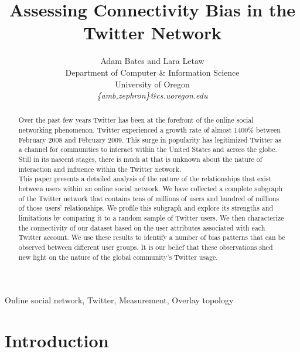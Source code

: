 \documentclass[10pt,twocolumn]{IEEEtran11}
\begin{document}


\title{\Large \bf Assessing Connectivity Bias in the Twitter Network
}

\author{Adam Bates and Lara Letaw\\
Department of Computer \& Information Science\\
University of Oregon\\
\textit{\{amb,zephron\}@cs.uoregon.edu}}

\maketitle
\pagestyle{empty}
\begin{abstract}
Over the past few years Twitter has been at the forefront of the online social networking phenomenon.  Twitter experienced a growth rate of almost 1400\% between February 2008 and February 2009.  This surge in popularity has legitimized Twitter as a channel for communities to interact within the United States and across the globe.  Still in its nascent stages, there is much at that is unknown about the nature of interaction and influence within the Twitter network.\\
This paper presents a detailed analysis of the nature of the relationships that exist between users within an online social network.  We have collected a complete subgraph of the Twitter network that contains tens of millions of users and hundred of millions of those users' relationships.  We profile this subgraph and explore its strengths and limitations by comparing it to a random sample of Twitter users.  We then characterize the connectivity of our dataset based on the user attributes associated with each Twitter account.  We use these results to identify a number of bias patterns that can be observed between different user groups.  It is our belief that these observations shed new light on the nature of the global community's Twitter usage.\\
\end{abstract}

\begin{keywords} 
Online social network, Twitter, Measurement, Overlay topology
\end{keywords}

\section{Introduction}
\label{sec:introduction}

\end{document}
